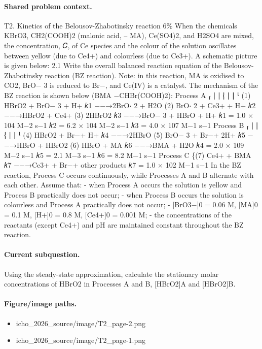 \paragraph{Shared problem context.}
T2. Kinetics of the Belousov-Zhabotinsky reaction 6\% When the chemicals KBrO3, CH2(COOH)2 (malonic acid, – MA), Ce(SO4)2, and H2SO4 are mixed, the concentration, 𝐶, of Ce species and the colour of the solution oscillates between yellow (due to Ce4+) and colourless (due to Ce3+). A schematic picture is given below: 2.1 Write the overall balanced reaction equation of the Belousov-Zhabotinsky reaction (BZ reaction). Note: in this reaction, MA is oxidised to CO2, BrO− 3 is reduced to Br−, and Ce(IV) is a catalyst. The mechanism of the BZ reaction is shown below (BMA −CHBr(COOH)2): Process A ⎧ ⎪ ⎪ ⎨ ⎪ ⎪ ⎩ (1) HBrO2 + BrO− 3 + H+ 𝑘1 −−→2BrO⋅ 2 + H2O (2) BrO⋅ 2 + Ce3+ + H+ 𝑘2 −−→HBrO2 + Ce4+ (3) 2HBrO2 𝑘3 −−→BrO− 3 + HBrO + H+ 𝑘1 = 1.0 × 104 M−2 s−1 𝑘2 = 6.2 × 104 M−2 s−1 𝑘3 = 4.0 × 107 M−1 s−1 Process B ⎧ ⎪ ⎪ ⎨ ⎪ ⎪ ⎩ (4) HBrO2 + Br−+ H+ 𝑘4 −−→2HBrO (5) BrO− 3 + Br−+ 2H+ 𝑘5 −−→HBrO + HBrO2 (6) HBrO + MA 𝑘6 −−→BMA + H2O 𝑘4 = 2.0 × 109 M−2 s−1 𝑘5 = 2.1 M−3 s−1 𝑘6 = 8.2 M−1 s−1 Process C \{(7) Ce4+ + BMA 𝑘7 −−→Ce3+ + Br−+ other products 𝑘7 = 1.0 × 102 M−1 s−1 In the BZ reaction, Process C occurs continuously, while Processes A and B alternate with each other. Assume that: - when Process A occurs the solution is yellow and Process B practically does not occur; - when Process B occurs the solution is colourless and Process A practically does not occur; - [BrO3−]0 = 0.06 M, [MA]0 = 0.1 M, [H+]0 = 0.8 M, [Ce4+]0 = 0.001 M; - the concentrations of the reactants (except Ce4+) and pH are maintained constant throughout the BZ reaction.

\paragraph{Current subquestion.}
Using the steady-state approximation, calculate the stationary molar concentrations of HBrO2 in Processes A and B, [HBrO2]A and [HBrO2]B.

\paragraph{Figure/image paths.}
\begin{itemize}
\item icho\_2026\_source/image/T2\_page-2.png
\item icho\_2026\_source/image/T2\_page-1.png
\end{itemize}

